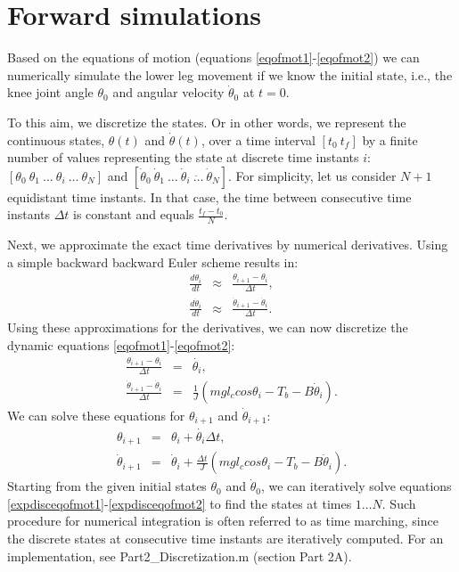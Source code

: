 \documentclass[
a4paper, %
11pt, %
onecolumn, %
openright, %
]{memoir}
\begin{document}
\chapter{Forward simulations}

Based on the equations of motion (equations \ref{eqofmot1}-\ref{eqofmot2}) we can numerically simulate the lower leg movement if we know the initial state, i.e., the knee joint angle $\theta_0$ and angular velocity $\dot{\theta}_0$ at $t = 0$. 

To this aim, we discretize the states. Or in other words, we represent the continuous states, $\theta(t)$ and $\dot\theta(t)$, over a time interval $[t_0 \: t_f]$ by a finite number of values representing the state at discrete time instants $i$: $[\theta_0 \: \theta_1 \: \ldots \: \theta_i \: \ldots \: \theta_N]$ and $[\dot\theta_0 \: \dot\theta_1 \: \ldots \: \dot\theta_i \: \dot\ldots \: \dot\theta_N]$. For simplicity, let us consider $N + 1$ equidistant time instants. In that case, the time between consecutive time instants $\Delta t$ is constant and equals $\frac{t_f - t_0}{N}$. 

Next, we approximate the exact time derivatives by numerical derivatives. Using a simple backward backward Euler scheme results in:
\begin{eqnarray}
\frac{d\theta_i}{dt} & \approx & \frac{\theta_{i+1} - \theta_{i}}{\Delta t}, \\
\frac{d\dot\theta_i}{dt} & \approx & \frac{\dot\theta_{i+1} - \dot\theta_{i}}{\Delta t}.
\label{BE}
\end{eqnarray}
Using these approximations for the derivatives, we can now discretize the dynamic equations \ref{eqofmot1}-\ref{eqofmot2}:
\begin{eqnarray}
\frac{\theta_{i+1} - \theta_{i}}{\Delta t} & = & \dot{\theta_i}, \\
\frac{\dot\theta_{i+1} - \dot\theta_{i}}{\Delta t} & = &\frac{1}{J} \left( m g l_c cos\theta_i - T_b - B \dot{\theta}_i \right).
\label{discseteqofmot}
\end{eqnarray}
We can solve these equations for $\theta_{i+1}$ and $\dot\theta_{i+1}$:
\begin{eqnarray}
\theta_{i+1} & = & \theta_{i} + \dot{\theta_i} \Delta t , \label{expdisceqofmot1}\\
\dot\theta_{i+1} & = & \dot\theta_{i} + \frac{\Delta t}{J} \left( m g l_c cos\theta_i - T_b - B \dot{\theta}_i \right).
\label{expdisceqofmot2}
\end{eqnarray}
Starting from the given initial states $\theta_0$ and $\dot{\theta}_0$, we can iteratively solve equations \ref{expdisceqofmot1}-\ref{expdisceqofmot2} to find the states at times $1 \ldots N$. Such procedure for numerical integration is often referred to as time marching, since the discrete states at consecutive time instants are iteratively computed. For an implementation, see Part2\_Discretization.m (section Part 2A).
\end{document}
